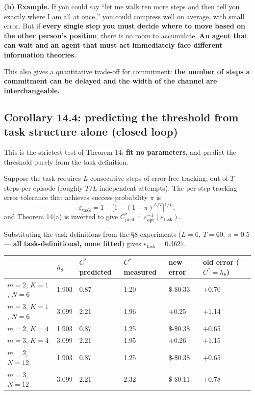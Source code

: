 \documentclass[11pt]{article}
\begin{document}
\textbf{(b) Example.} If you could say ``let me walk ten more steps and then tell you exactly where I am all at once,'' you could compress well on average, with small error. But if \textbf{every single step you must decide where to move based on the other person's position}, there is no room to accumulate. \textbf{An agent that can wait and an agent that must act immediately face different information theories.}

This also gives a quantitative trade-off for commitment: \textbf{the number of steps a commitment can be delayed and the width of the channel are interchangeable.}

\hypertarget{corollary-14.4-predicting-the-threshold-from-task-structure-alone-closed-loop}{%
\subsection{Corollary 14.4: predicting the threshold from task structure alone (closed loop)}\label{corollary-14.4-predicting-the-threshold-from-task-structure-alone-closed-loop}}

This is the strictest test of Theorem 14: \textbf{fit no parameters}, and predict the threshold purely from the task definition.

Suppose the task requires \(L\) consecutive steps of error-free tracking, out of \(T\) steps per episode (roughly \(T/L\) independent attempts). The per-step tracking error tolerance that achieves success probability \(\pi\) is
\[\varepsilon_{\text{task}}=1-\Big[1-(1-\pi)^{L/T}\Big]^{1/L},\]
and Theorem 14(a) is inverted to give \(C^*_{\text{pred}}=\varepsilon_{\mathrm{opt}}^{-1}(\varepsilon_{\text{task}})\).

Substituting the task definitions from the \S{}8 experiments (\(L=6,\ T=60,\ \pi=0.5\) --- \textbf{all task-definitional, none fitted}) gives \(\varepsilon_{\text{task}}=0.3627\).

\begin{longtable}[]{@{}llllll@{}}
\toprule
& \(h_\theta\) & \(C^*\) predicted & \(C^*\) measured & new error & old error (\(C^*=h_\theta\))\tabularnewline
\midrule
\endhead
\(m=2\), \(K=1\), \(N=6\) & 1.903 & 0.87 & 1.20 & \$-\$0.33 & +0.70\tabularnewline
\(m=3\), \(K=1\), \(N=6\) & 3.099 & 2.21 & 1.96 & +0.25 & +1.14\tabularnewline
\(m=2\), \(K=4\) & 1.903 & 0.87 & 1.25 & \$-\$0.38 & +0.65\tabularnewline
\(m=3\), \(K=4\) & 3.099 & 2.21 & 1.95 & +0.26 & +1.15\tabularnewline
\(m=2\), \(N=12\) & 1.903 & 0.87 & 1.25 & \$-\$0.38 & +0.65\tabularnewline
\(m=3\), \(N=12\) & 3.099 & 2.21 & 2.32 & \$-\$0.11 & +0.78\tabularnewline
\bottomrule
\end{longtable}
\end{document}

